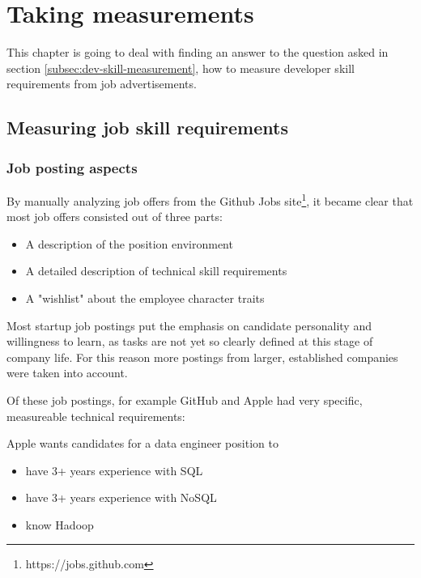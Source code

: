 \chapter{Taking measurements}
This chapter is going to deal with finding an answer
to the question asked in section \ref{subsec:dev-skill-measurement},
how to measure developer skill requirements from job advertisements.

\section{Measuring job skill requirements}


\subsection{Job posting aspects}
By manually analyzing job offers from the Github Jobs
site\footnote{https://jobs.github.com}, it became clear that most
job offers consisted out of three parts:

\begin{itemize}
\item A description of the position environment
\item A detailed description of technical skill requirements
\item A "wishlist" about the employee character traits
\end{itemize}

Most startup job postings put the emphasis on candidate personality and
willingness to learn, as tasks are not yet so clearly defined at this stage
of company life. For this reason more postings from larger, established
companies were taken into account.


Of these job postings, for example GitHub and Apple had very
specific, measureable technical requirements:
\newline

Apple wants candidates for a data engineer position to
\begin{itemize}
    \item have 3+ years experience with SQL
    \item have 3+ years experience with NoSQL
    \item know Hadoop
\end{itemize}

